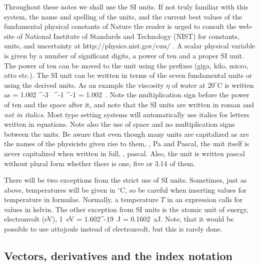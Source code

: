 Throughout these notes we shall use the SI units. If not truly
familiar with this system, the name and spelling of the units, and
the current best values of the fundamental physical constants of
Nature the reader is urged to consult the web-site of National
Institute of Standards and Technology (NIST) for constants, units,
and uncertainty at
%
  \textrm{http:/$\!$/physics.nist.gov/cuu/} \; .
 \eeq
%
A scalar physical variable is given by a number of significant
digits, a power of ten and a proper SI unit. The power of ten can
be moved to the unit using the prefixes (giga, kilo, micro, atto
etc.). The SI unit can be written in terms of the seven
fundamental units or using the derived units. As an example the
viscosity $\eta$ of water at $20^\circ$C is written as
%
 \eta =
 1.002 ^{-3}~\SIkg\: \SIm^{-1} \SIs^{-1}
 = 1.002~\SImPas.
 \eeq{}
%
Note the multiplication sign before the power of ten and the space
after it, and note that the SI units are written in roman and
\textit{not in italics}. Most type setting systems will
automatically use italics for letters written in equations. Note
also the use of space and no multiplication signs between the
units. Be aware that even though many units are capitalized as are
the names of the physicists given rise to them, \eg, Pa and
Pascal, the unit itself is never capitalized when written in full,
\eg, pascal. Also, the unit is written pascal without plural form
whether there is one, five or 3.14 of them.

There will be two exceptions from the strict use of SI units.
Sometimes, just as above, temperatures will be given in $^\circ$C,
so be careful when inserting values for temperature in formulae.
Normally, a temperature $T$ in an expression calls for values in
kelvin. The other exception from SI units is the atomic unit of
energy, electronvolt (eV),
%
  1~\textrm{eV} = 1.602^{-19}~\textrm{J}
 = 0.1602~\textrm{aJ}.
 \eeq
%
Note, that it would be possible to use attojoule instead of
electronvolt, but this is rarely done.


\subsection{Vectors, derivatives and the index notation}

